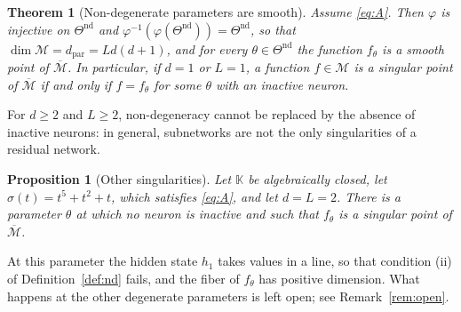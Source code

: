 \documentclass[11pt]{article}
\newtheorem{maintheorem}{Theorem}
\newtheorem{proposition}[lemma]{Proposition}
\theoremstyle{definition}
\theoremstyle{remark}
\newcommand{\K}{\mathbb{K}}
\newcommand{\M}{\mathcal{M}}
\newcommand{\Mbar}{\overline{\M}}
\newcommand{\dpar}{d_{\mathrm{par}}}
\newcommand{\Tn}{\Theta^{\mathrm{nd}}}
\begin{document}
\begin{maintheorem}[Non-degenerate parameters are smooth]\label{thm:smooth}
Assume \eqref{eq:A}. Then $\varphi$ is injective on $\Tn$ and $\varphi^{-1}(\varphi(\Tn))=\Tn$, so that $\dim\M=\dpar=Ld(d+1)$, and for every $\theta\in\Tn$ the function $f_\theta$ is a smooth point of $\Mbar$. In particular, if $d=1$ or $L=1$, a function $f\in\M$ is a singular point of $\Mbar$ if and only if $f=f_\theta$ for some $\theta$ with an inactive neuron.
\end{maintheorem}

For $d\ge2$ and $L\ge2$, non-degeneracy cannot be replaced by the absence of inactive neurons: in general, subnetworks are not the only singularities of a residual network.

\begin{proposition}[Other singularities]\label{prop:other}
Let $\K$ be algebraically closed, let $\sigma(t)=t^5+t^2+t$, which satisfies \eqref{eq:A}, and let $d=L=2$. There is a parameter $\theta$ at which no neuron is inactive and such that $f_\theta$ is a singular point of $\Mbar$.
\end{proposition}

At this parameter the hidden state $h_1$ takes values in a line, so that condition (ii) of Definition~\ref{def:nd} fails, and the fiber of $f_\theta$ has positive dimension. What happens at the other degenerate parameters is left open; see Remark~\ref{rem:open}.
\end{document}
